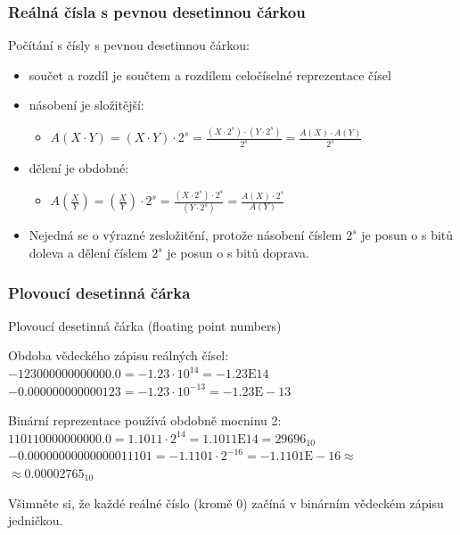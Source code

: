 \begin{frame}
\frametitle{Reálná čísla s pevnou desetinnou čárkou}

Počítání s čísly s pevnou desetinnou čárkou:

\begin{itemize}
\item součet a rozdíl je součtem a rozdílem celočíselné reprezentace čísel
\item násobení je složitější:
\begin{itemize}
\item $A(X \cdot Y) = (X \cdot Y ) \cdot 2^s = \frac{(X \cdot 2^s)\cdot( Y\cdot 2^s) }{2^s} = \frac{A(X) \cdot A(Y)}{2^s}$
\end{itemize}
\item dělení je obdobné:
\begin{itemize}
\item $A(\frac{X}{Y}) = (\frac{X}{Y}) \cdot 2^s = \frac{(X \cdot 2^s)\cdot2^s }{( Y\cdot 2^s)} = \frac{A(X) \cdot 2^s}{A(Y)}$
\end{itemize}
\item Nejedná se o výrazné zesložitění, protože násobení číslem $2^s$ je posun o s bitů doleva a dělení číslem $2^s$ je posun o s bitů doprava.
\end{itemize}



\end{frame}


\begin{frame}
\frametitle{Plovoucí desetinná čárka}

Plovoucí desetinná čárka (floating point numbers)

\bigskip

Obdoba vědeckého zápisu reálných čísel:
$-123 000 000 000 000.0 = -1.23 \cdot 10^{14} = -1.23\text{E} 14$\\
$-0.000 000 000 000 123 = -1.23 \cdot 10^{-13} = -1.23\text{E}-13$\\

\bigskip

Binární reprezentace používá obdobně mocninu 2:\\
$110 1100 0000 0000.0 = 1.1011 \cdot 2^{14} = 1.1011\text{E} 14 = 29696_{10}$\\
$-0.0000 0000 0000 0001 1101 = -1.1101 \cdot 2^{-16} = -1.1101\text{E}-16 \approx$\\
\phantom{xxxxxxxxxxxxxxxxxxxxxxxxxxxxxxxxxxxxxxxxxx}$\approx0.00002765_{10}$\\

\bigskip

Všimněte si, že každé reálné číslo (kromě 0) začíná v binárním vědeckém zápisu jedničkou.


\end{frame}

